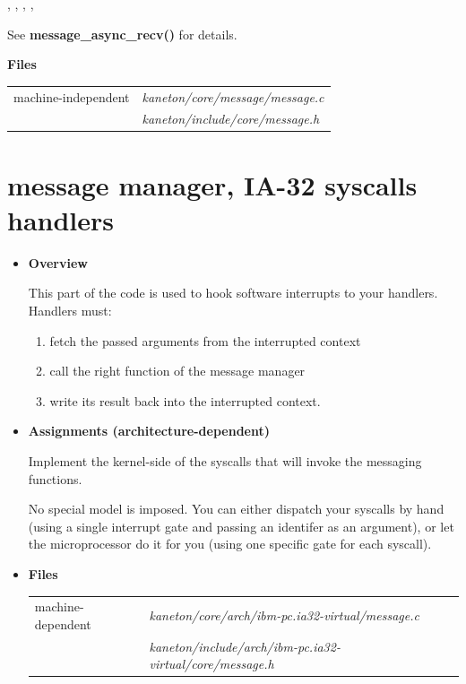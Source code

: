 \begin{itemize}
{	   \item {}, , ,
	     , 

	     See \textbf{message\_async\_recv()} for details.
	 }


  \item {\bf {Files}}

    \begin{tabular}{| l | l |}
      \hline
      machine-independent & {\em kaneton/core/message/message.c}\\
      &  {\em kaneton/include/core/message.h}\\\hline
    \end{tabular}
\end{itemize}

\section{message manager, \textbf{IA-32 syscalls handlers}}
\begin{itemize}
  \item {\bf Overview}

    This part of the code is used to hook software interrupts to your
    handlers. Handlers must:

    \begin{enumerate}
      \item fetch the passed arguments from the interrupted context
      \item call the right function of the message manager
      \item write its result back into the interrupted context.
    \end{enumerate}

  \item {\bf Assignments (architecture-dependent)}

    Implement the kernel-side of the syscalls that will invoke the messaging
    functions.

    No special model is imposed. You can either dispatch your syscalls by hand
    (using a single interrupt gate and passing an identifer as an argument),
    or let the microprocessor do it for you (using one specific gate for each
    syscall).

  \item {\bf {Files}}

    \begin{tabular}{| l | l |}
      \hline
      machine-dependent & {\em kaneton/core/arch/ibm-pc.ia32-virtual/message.c}\\
      & {\em kaneton/include/arch/ibm-pc.ia32-virtual/core/message.h}\\\hline
    \end{tabular}

\end{itemize}

